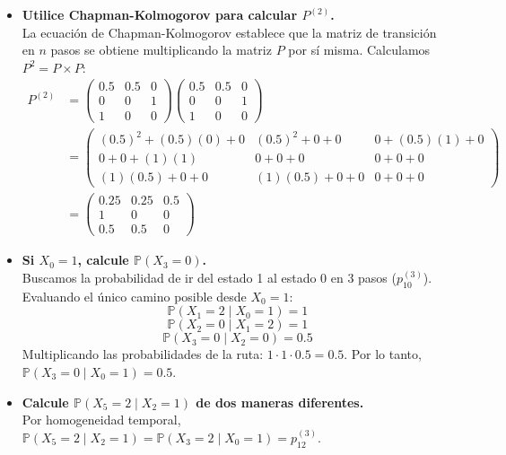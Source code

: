 \documentclass[10pt,a4paper]{book}
\begin{document}
\begin{itemize}
    \item[\textbf{c)}] \textbf{Utilice Chapman-Kolmogorov para calcular $P^{(2)}$.} \\
    La ecuación de Chapman-Kolmogorov establece que la matriz de transición en $n$ pasos se obtiene multiplicando la matriz $P$ por sí misma. Calculamos $P^2 = P \times P$:
    \begin{align*}
        P^{(2)} &= \begin{pmatrix} 0.5 & 0.5 & 0 \\ 0 & 0 & 1 \\ 1 & 0 & 0 \end{pmatrix} 
        \begin{pmatrix} 0.5 & 0.5 & 0 \\ 0 & 0 & 1 \\ 1 & 0 & 0 \end{pmatrix} \\  
        &= \begin{pmatrix} 
        (0.5)^2+(0.5)(0)+0 & (0.5)^2+0+0 & 0+(0.5)(1)+0 \\ 
        0+0+(1)(1) & 0+0+0 & 0+0+0 \\ 
        (1)(0.5)+0+0 & (1)(0.5)+0+0 & 0+0+0 
        \end{pmatrix} \\
        &= \begin{pmatrix} 0.25 & 0.25 & 0.5 \\ 1 & 0 & 0 \\ 0.5 & 0.5 & 0 
        \end{pmatrix}
    \end{align*}

\newpage

\item[\textbf{d)}] \textbf{Si $X_0 = 1$, calcule $\mathbb{P}(X_3 = 0)$.} \\
    Buscamos la probabilidad de ir del estado 1 al estado 0 en 3 pasos ($p_{10}^{(3)}$). Evaluando el único camino posible desde $X_0=1$:
    \[ \mathbb{P}(X_1=2 \mid X_0=1) = 1 \]
    \[ \mathbb{P}(X_2=0 \mid X_1=2) = 1 \]
    \[ \mathbb{P}(X_3=0 \mid X_2=0) = 0.5 \]
    Multiplicando las probabilidades de la ruta: $1 \cdot 1 \cdot 0.5 = 0.5$. 
    Por lo tanto, $\mathbb{P}(X_3 = 0 \mid X_0 = 1) = 0.5$.

    \vspace{0.5cm}
    \item[\textbf{e)}] \textbf{Calcule $\mathbb{P}(X_5 = 2 \mid X_2 = 1)$ de dos maneras diferentes.} \\
    Por homogeneidad temporal, $\mathbb{P}(X_5 = 2 \mid X_2 = 1) = \mathbb{P}(X_3 = 2 \mid X_0 = 1) = p_{12}^{(3)}$.
    

\end{itemize}
\end{document}
